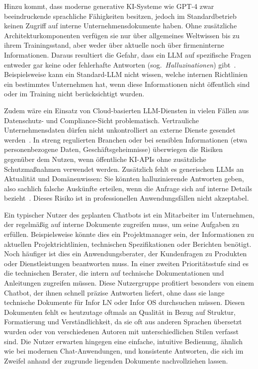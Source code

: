 Hinzu kommt, dass moderne generative KI-Systeme wie GPT-4 zwar beeindruckende sprachliche Fähigkeiten besitzen, jedoch im Standardbetrieb keinen Zugriff auf interne Unternehmensdokumente haben.
Ohne zusätzliche Architekturkomponenten verfügen sie nur über allgemeines Weltwissen bis zu ihrem Trainingsstand, aber weder über aktuelle noch über firmeninterne Informationen.
Daraus resultiert die Gefahr, dass ein LLM auf spezifische Fragen entweder gar keine oder fehlerhafte Antworten (sog.\ \textit{Halluzinationen}) gibt~\cite{wikipedia_rag}.
Beispielsweise kann ein Standard-LLM nicht wissen, welche internen Richtlinien ein bestimmtes Unternehmen hat, wenn diese Informationen nicht öffentlich sind oder im Training nicht berücksichtigt wurden.

Zudem wäre ein Einsatz von Cloud-basierten LLM-Diensten in vielen Fällen aus Datenschutz- und Compliance-Sicht problematisch.
Vertrauliche Unternehmensdaten dürfen nicht unkontrolliert an externe Dienste gesendet werden~\cite{punctuations_onpremise_llm}.
In streng regulierten Branchen oder bei sensiblen Informationen (etwa personenbezogene Daten, Geschäftsgeheimnisse) überwiegen die Risiken gegenüber dem Nutzen, wenn öffentliche KI-APIs ohne zusätzliche Schutzmaßnahmen verwendet werden.
Zusätzlich fehlt es generischen LLMs an Aktualität und Domänenwissen: Sie könnten halluzinierende Antworten geben, also sachlich falsche Auskünfte erteilen, wenn die Anfrage sich auf interne Details bezieht~\cite{wikipedia_rag_improvement}.
Dieses Risiko ist in professionellen Anwendungsfällen nicht akzeptabel.

Ein typischer Nutzer des geplanten Chatbots ist ein Mitarbeiter im Unternehmen, der regelmäßig auf interne Dokumente zugreifen muss, um seine Aufgaben zu erfüllen.
Beispielsweise könnte dies ein Projektmanager sein, der Informationen zu aktuellen Projektrichtlinien, technischen Spezifikationen oder Berichten benötigt.
Noch häufiger ist dies ein Anwendungsberater, der Kundenfragen zu Produkten oder Dienstleistungen beantworten muss.
In einer zweiten Prioritätsstufe sind es die technischen Berater, die intern auf technische Dokumentationen und Anleitungen zugreifen müssen.
Diese Nutzergruppe profitiert besonders von einem Chatbot, der ihnen schnell präzise Antworten liefert, ohne dass sie lange technische Dokumente für Infor LN oder Infor OS durchsuchen müssen.
Diesen Dokumenten fehlt es heutzutage oftmals an Qualität in Bezug auf Struktur, Formatierung und Verständlichkeit, da sie oft aus anderen Sprachen übersetzt wurden oder von verschiedenen Autoren mit unterschiedlichen Stilen verfasst sind.
Die Nutzer erwarten hingegen eine einfache, intuitive Bedienung, ähnlich wie bei modernen Chat-Anwendungen, und konsistente Antworten, die sich im Zweifel anhand der zugrunde liegenden Dokumente nachvollziehen lassen.

